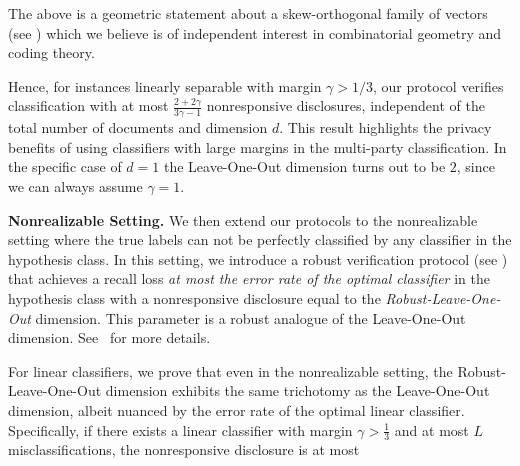 \begin{remark*}
    The above is a geometric statement about a skew-orthogonal family of vectors (see ) which we believe is of independent interest in combinatorial geometry and coding theory.
\end{remark*}

Hence, for instances linearly separable with margin $\gamma > 1/3$, our protocol verifies classification with at most 
$\frac{2 + 2\gamma}{3\gamma - 1}$
nonresponsive disclosures, independent of the total number of documents and dimension $d$. This result highlights the privacy benefits of using classifiers with large margins in the multi-party classification.
In the specific case of $d=1$ the Leave-One-Out dimension turns out to be $2$, since we can always assume $\gamma = 1$.

\textbf{Nonrealizable Setting.}
We then extend our protocols to the nonrealizable setting where the true labels can not be perfectly classified by any classifier in the hypothesis class.
In this setting, we introduce a robust verification protocol (see ) that achieves a recall loss \emph{at most the error rate of the optimal classifier} in the hypothesis class with a nonresponsive disclosure equal to the \emph{Robust-Leave-One-Out} dimension. This parameter is a robust analogue of the Leave-One-Out dimension. See~ for more details. 


For linear classifiers, we prove that even in the nonrealizable setting, the Robust-Leave-One-Out dimension exhibits the same trichotomy as the Leave-One-Out dimension, albeit nuanced by the error rate of the optimal linear classifier. Specifically, if there exists a linear classifier with margin $\gamma > \frac{1}{3}$ and at most $L$ misclassifications, the nonresponsive disclosure is at most 

